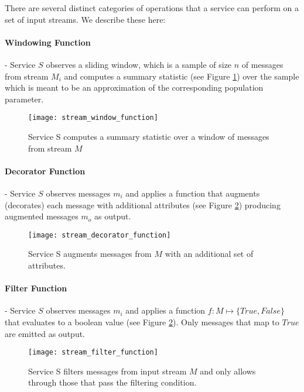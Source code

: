 There are several distinct categories of operations that a service can perform on a set of input streams. We describe these here:

\paragraph{Windowing Function} - Service $S$ observes a sliding window, which is a sample of size $n$ of messages from stream $M_i$ and computes a summary statistic (see Figure \ref{fig:stream_window_function}) over the sample which is meant to be an approximation of the corresponding population parameter.

\begin{figure}[H]
\texttt{[image: stream\_window\_function]}
\centering
\caption {Service S computes a summary statistic over a window of messages from stream $M$}
\label{fig:stream_window_function}
\end{figure}
 
\paragraph{Decorator Function} - Service $S$ observes messages $m_i$ and applies a function that augments (decorates) each message with additional attributes (see Figure \ref{fig:stream_decorator_function}) producing augmented messages $m_o$ as output.

\begin{figure}[H]
\texttt{[image: stream\_decorator\_function]}
\centering
\caption {Service S augments messages from $M$ with an additional set of attributes.}
\label{fig:stream_decorator_function}
\end{figure}

\paragraph{Filter Function} - Service $S$ observes messages $m_i$ and applies a function $f:M\mapsto\{True,False\}$ that evaluates to a boolean value (see Figure \ref{fig:stream_decorator_function}). Only messages that map to $True$ are emitted as output.

\begin{figure}[H]
\texttt{[image: stream\_filter\_function]}
\centering
\caption {Service S filters messages from input stream $M$ and only allows through those that pass the filtering condition.}
\label{fig:stream_filter_function}
\end{figure}

